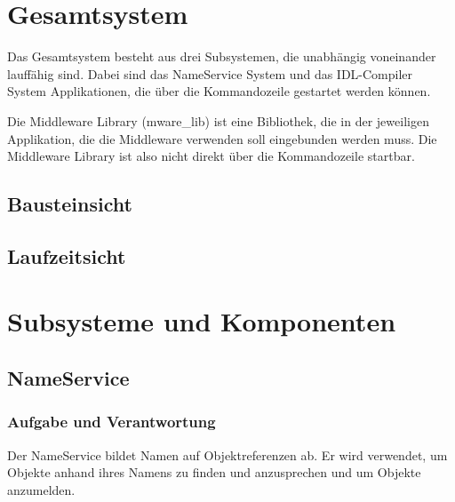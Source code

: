 \documentclass{article}
\begin{document}
\section{Gesamtsystem}
Das Gesamtsystem besteht aus drei Subsystemen, die unabhängig voneinander lauffähig sind.
Dabei sind das NameService System und das IDL-Compiler System Applikationen, die über
die Kommandozeile gestartet werden können.

Die Middleware Library (mware\_lib) ist eine Bibliothek, die in der jeweiligen Applikation,
die die Middleware verwenden soll eingebunden werden muss. Die Middleware Library ist also
nicht direkt über die Kommandozeile startbar.

\subsection{Bausteinsicht}

\subsection{Laufzeitsicht}

\newpage

\section{Subsysteme und Komponenten}

\subsection{NameService}
\subsubsection{Aufgabe und Verantwortung}
Der NameService bildet Namen auf Objektreferenzen ab. Er wird verwendet, um Objekte anhand
ihres Namens zu finden und anzusprechen und um Objekte anzumelden.
\end{document}
